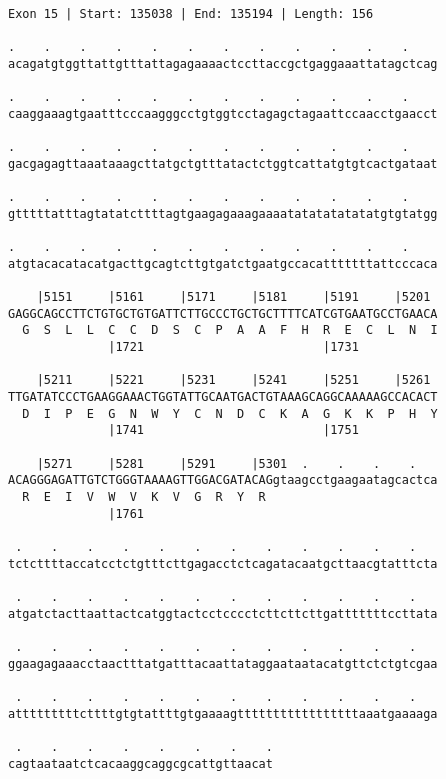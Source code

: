 \documentclass{article}
\begin{document}
\newpage
\begin{Verbatim}[fontfamily=courier]
Exon 15 | Start: 135038 | End: 135194 | Length: 156

.    .    .    .    .    .    .    .    .    .    .    .    
acagatgtggttattgtttattagagaaaactccttaccgctgaggaaattatagctcag

.    .    .    .    .    .    .    .    .    .    .    .    
caaggaaagtgaatttcccaagggcctgtggtcctagagctagaattccaacctgaacct

.    .    .    .    .    .    .    .    .    .    .    .    
gacgagagttaaataaagcttatgctgtttatactctggtcattatgtgtcactgataat

.    .    .    .    .    .    .    .    .    .    .    .    
gtttttatttagtatatcttttagtgaagagaaagaaaatatatatatatatgtgtatgg

.    .    .    .    .    .    .    .    .    .    .    .    
atgtacacatacatgacttgcagtcttgtgatctgaatgccacatttttttattcccaca

    |5151     |5161     |5171     |5181     |5191     |5201 
GAGGCAGCCTTCTGTGCTGTGATTCTTGCCCTGCTGCTTTTCATCGTGAATGCCTGAACA
  G  S  L  L  C  C  D  S  C  P  A  A  F  H  R  E  C  L  N  I
              |1721                         |1731           

    |5211     |5221     |5231     |5241     |5251     |5261 
TTGATATCCCTGAAGGAAACTGGTATTGCAATGACTGTAAAGCAGGCAAAAAGCCACACT
  D  I  P  E  G  N  W  Y  C  N  D  C  K  A  G  K  K  P  H  Y
              |1741                         |1751           

    |5271     |5281     |5291     |5301  .    .    .    .   
ACAGGGAGATTGTCTGGGTAAAAGTTGGACGATACAGgtaagcctgaagaatagcactca
  R  E  I  V  W  V  K  V  G  R  Y  R                        
              |1761                                         

 .    .    .    .    .    .    .    .    .    .    .    .   
tctcttttaccatcctctgtttcttgagacctctcagatacaatgcttaacgtatttcta

 .    .    .    .    .    .    .    .    .    .    .    .   
atgatctacttaattactcatggtactcctcccctcttcttcttgatttttttccttata

 .    .    .    .    .    .    .    .    .    .    .    .   
ggaagagaaacctaactttatgatttacaattataggaataatacatgttctctgtcgaa

 .    .    .    .    .    .    .    .    .    .    .    .   
atttttttttcttttgtgtattttgtgaaaagtttttttttttttttttaaatgaaaaga

 .    .    .    .    .    .    .    .
cagtaataatctcacaaggcaggcgcattgttaacat
\end{Verbatim}
\end{document}
